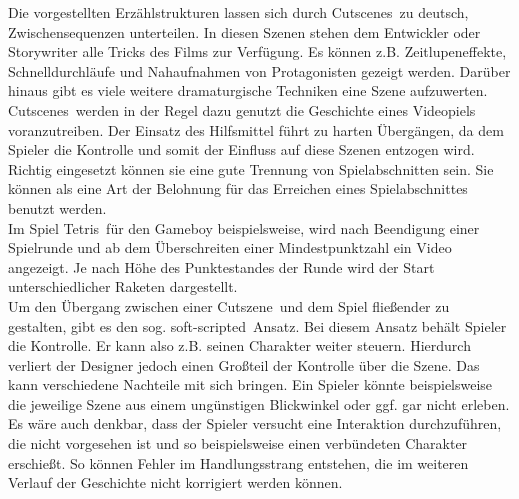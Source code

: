Die vorgestellten Erzählstrukturen lassen sich durch \glqq Cutscenes\grqq\, zu deutsch, Zwischensequenzen unterteilen. In diesen Szenen stehen dem Entwickler oder Storywriter alle Tricks des Films zur Verfügung. Es können z.B. Zeitlupeneffekte, Schnelldurchläufe und Nahaufnahmen von Protagonisten gezeigt werden. Darüber hinaus gibt es viele weitere dramaturgische Techniken eine Szene aufzuwerten. \glqq Cutscenes\grqq\ werden in der Regel dazu genutzt die Geschichte eines Videopiels voranzutreiben. Der Einsatz des Hilfsmittel führt zu harten Übergängen, da dem Spieler die Kontrolle und somit der Einfluss auf diese Szenen entzogen wird. Richtig eingesetzt können sie eine gute Trennung von Spielabschnitten sein. Sie können als eine Art der Belohnung für das Erreichen eines Spielabschnittes benutzt werden. \\
Im Spiel \glqq Tetris\grqq\ für den Gameboy beispielsweise, wird nach Beendigung einer Spielrunde und ab dem Überschreiten einer Mindestpunktzahl ein Video angezeigt. Je nach Höhe des Punktestandes der Runde wird der Start unterschiedlicher Raketen dargestellt.  \\
Um den Übergang zwischen einer \glqq Cutszene\grqq\ und dem Spiel fließender zu gestalten, gibt es den sog. \glqq soft-scripted\grqq\ Ansatz. Bei diesem Ansatz behält Spieler die Kontrolle. Er kann also z.B. seinen Charakter weiter steuern. Hierdurch verliert der Designer jedoch einen Großteil der Kontrolle über die Szene. Das kann verschiedene Nachteile mit sich bringen. Ein Spieler könnte beispielsweise die jeweilige Szene aus einem ungünstigen Blickwinkel oder ggf. gar nicht erleben. Es wäre auch denkbar, dass der Spieler versucht eine Interaktion durchzuführen, die nicht vorgesehen ist und so beispielsweise einen verbündeten Charakter erschießt. So können Fehler im Handlungsstrang entstehen, die im weiteren Verlauf der Geschichte nicht korrigiert werden können. 





